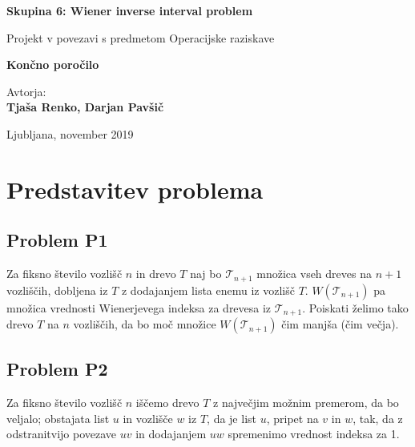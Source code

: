 \documentclass[a4paper, 12 pt]{article}
\begin{document}
\begin{titlepage}

\begin{center}



\Huge
\textbf{Skupina 6: Wiener inverse interval problem}

\vspace{0.5cm}
\large{Projekt v povezavi s predmetom Operacijske raziskave}

\vspace{2.5cm}
\Large
\textbf{Končno poročilo}

\vspace{2.5cm}
\large
Avtorja: \\
\textbf{Tjaša Renko, Darjan Pavšič}

\vfill

\large{Ljubljana, november 2019}


\end{center}
\end{titlepage}


\tableofcontents

\pagebreak

\section{Predstavitev problema}

\subsection{Problem P1}

Za fiksno število vozlišč $n$ in drevo $T$ naj bo $\mathscr{T}_{n+1}$ množica vseh dreves na $n+1$ vozliščih, dobljena iz $T$ z dodajanjem lista enemu iz vozlišč $T$. $W(\mathscr{T}_{n+1})$ pa množica vrednosti Wienerjevega indeksa za drevesa iz $\mathscr{T}_{n+1}$. Poiskati želimo tako drevo $T$ na $n$ vozliščih, da bo moč množice $W(\mathscr{T}_{n+1})$ čim manjša (čim večja).


\subsection{Problem P2}

Za fiksno število vozlišč $n$ iščemo drevo $T$ z največjim možnim premerom, da bo veljalo; obstajata list $u$ in vozlišče $w$ iz $T$, da je list $u$, pripet na $v$ in $w$, tak, da z odstranitvijo povezave $uv$ in dodajanjem $uw$ spremenimo vrednost indeksa za 1.
\end{document}
